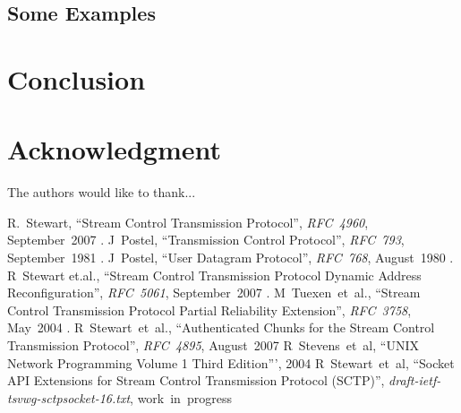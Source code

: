 \documentclass[conference]{IEEEtran}
\begin{document}
\subsection{Some Examples}


\section{Conclusion}

\section*{Acknowledgment}


The authors would like to thank...


\begin{thebibliography}{11}
 R.~Stewart,
  ``Stream Control Transmission Protocol'',
  \textit{RFC~4960},
  September~2007
.  J~Postel,
  ``Transmission Control Protocol'',
  \textit{RFC~793},
  September~1981
.  J~Postel,
  ``User Datagram Protocol'',
  \textit{RFC~768},
  August~1980
.  R~Stewart et.al.,
  ``Stream Control Transmission Protocol Dynamic Address Reconfiguration'',
  \textit{RFC~5061},
  September~2007
.  M~Tuexen~et~al.,
 ``Stream Control Transmission Protocol Partial Reliability Extension'',
  \textit{RFC~3758},
  May~2004
.  R~Stewart~et~al.,
  ``Authenticated Chunks for the Stream Control Transmission Protocol'',
  \textit{RFC~4895},
  August~2007
 R~Stevens~et~al,
 ``UNIX Network Programming Volume 1 Third Edition''',
2004
 R~Stewart~et~al,
 ``Socket API Extensions for Stream Control Transmission Protocol (SCTP)'',
 \textit{draft-ietf-tsvwg-sctpsocket-16.txt},
work~in~progress


\end{thebibliography}




\end{document}
